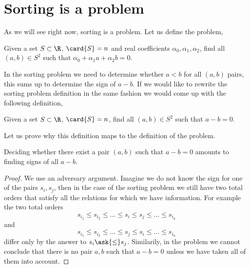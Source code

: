 \section{Sorting is a \twoLDT problem}

As we will see right now, sorting is a \twoLDT problem. Let us define the
\twoLDT problem,

\begin{problem}
Given a set $S \subset \R$, $\card{S} = n$ and real coefficients $\alpha_0,
\alpha_1, \alpha_2$, find all $(a,b) \in S^2$ such that
$\alpha_0 + \alpha_1 a + \alpha_2 b = 0$.
\end{problem}

In the sorting problem we need to determine whether $a < b$ for all $(a,b)$
pairs, this sums up to determine the sign of $a-b$. If we would like to rewrite
the sorting problem definition in the same fashion we would come up with the
following definition,

\begin{problem}
Given a set $S \subset \R$, $\card{S} = n$, find all $(a,b) \in S^2$ such that
$a - b = 0$.
\end{problem}

Let us prove why this definition maps to the definition of the \twoLDT
problem.

\begin{theorem}
Deciding whether there exist a pair \((a,b)\) such that \(a - b = 0\)
amounts to finding signs of all \(a-b\).
\end{theorem}

\begin{proof}
We use an adversary argument. Imagine we do not know the sign for one of the
pairs \(s_i,s_j\), then in the case of the sorting problem we still have two
total orders that satisfy all the relations for which we have information. For
example the two total orders
\begin{displaymath}
s_{i_1} \le s_{i_2} \le \ldots \le s_i \le s_j \le \ldots \le s_{i_n}
\end{displaymath}
and
\begin{displaymath}
s_{i_1} \le s_{i_2} \le \ldots \le s_j \le s_i \le \ldots \le s_{i_n}
\end{displaymath}
differ only by the answer to \(s_i \ask{\le} s_j\).
Similarily, in the \twoLDT problem we cannot conclude that there is no pair
\(a,b\) such that \(a-b=0\) unless we have taken all of them into account.
\end{proof}


